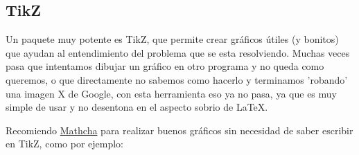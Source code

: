 \documentclass[11pt,letterpaper]{article}
\begin{document}
\subsection*{TikZ}
Un paquete muy potente es TikZ, que permite crear gráficos útiles (y bonitos) que ayudan al entendimiento del problema que se esta resolviendo. Muchas veces pasa que intentamos dibujar un gráfico en otro programa y no queda como queremos, o que directamente no sabemos como hacerlo y terminamos 'robando' una imagen X de Google, con esta herramienta eso ya no pasa, ya que es muy simple de usar y no desentona en el aspecto sobrio de \LaTeX.\par
Recomiendo \href{https://www.mathcha.io/}{Mathcha} para realizar buenos gráficos sin necesidad de saber escribir en TikZ, como por ejemplo:
\begin{figure}[H]
    \centering
    \begin{tikzpicture}[x=0.75pt,y=0.75pt,yscale=-1,xscale=1]


\end{tikzpicture}
\end{figure}
\end{document}

